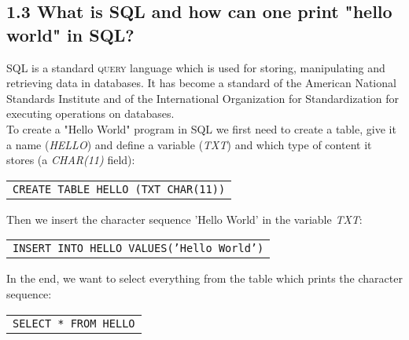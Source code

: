 \documentclass{article}
\begin{document}
	\subsection*{1.3 What is SQL and how can one print "hello world" in SQL?}
	\begin{adjustwidth}{2em}{2em}
		SQL is a standard \textsc{query} language which is used for storing, manipulating and retrieving data in databases. It has become a standard of the American National Standards Institute and of the International Organization for Standardization for executing operations on databases. \\
		To create a "Hello World" program in SQL we first need to create a table, give it a name (\textit{HELLO}) and define a variable (\textit{TXT}) and which type of content it stores (a \textit{CHAR(11)} field):
		\begin{adjustwidth}{8em}{}
			\begin{tabular}{l}
				\cellcolor[gray]{0.8}\texttt{CREATE TABLE HELLO (TXT CHAR(11))}
			\end{tabular}
		\end{adjustwidth}
		Then we insert the character sequence 'Hello World' in the variable \textit{TXT}:
		\begin{adjustwidth}{8em}{}
			\begin{tabular}{l}
				\cellcolor[gray]{0.8}\texttt{INSERT INTO HELLO VALUES('Hello World')}
			\end{tabular}
		\end{adjustwidth}
		In the end, we want to select everything from the table which prints the character sequence:
		\begin{adjustwidth}{8em}{}
			\begin{tabular}{l}
				\cellcolor[gray]{0.8}\texttt{SELECT * FROM HELLO}
			\end{tabular}
		\end{adjustwidth}
	\end{adjustwidth}
	
\end{document}

